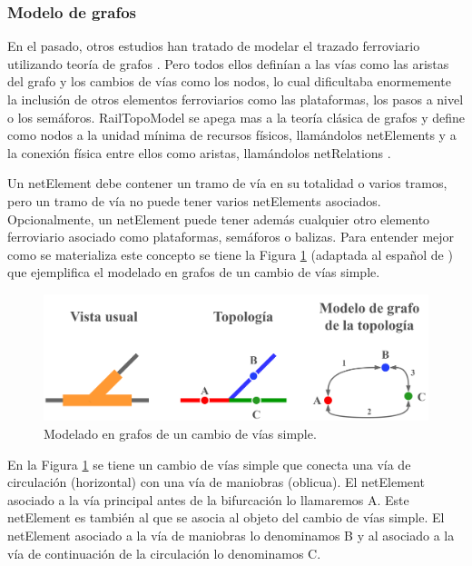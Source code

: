 \subsubsection{Modelo de grafos}
    \label{sec:RTM}
    
    En el pasado, otros estudios han tratado de modelar el trazado ferroviario utilizando teoría de grafos \cite{Paper_9,Paper_101,Paper_102,Paper_103}. Pero todos ellos definían a las vías como las aristas del grafo y los cambios de vías como los nodos, lo cual dificultaba enormemente la inclusión de otros elementos ferroviarios como las plataformas, los pasos a nivel o los semáforos. RailTopoModel se apega mas a la teoría clásica de grafos y define como nodos a la unidad mínima de recursos físicos, llamándolos netElements y a la conexión física entre ellos como aristas, llamándolos netRelations \cite{Paper_109}.

    Un netElement debe contener un tramo de vía en su totalidad o varios tramos, pero un tramo de vía no puede tener varios netElements asociados. Opcionalmente, un netElement puede tener además cualquier otro elemento ferroviario asociado como plataformas, semáforos o balizas. Para entender mejor como se materializa este concepto se tiene la Figura \ref{fig:grafos_1} (adaptada al español de \cite{Paper_109}) que ejemplifica el modelado en grafos de un cambio de vías simple.

    \begin{figure}[H]
        \centering
        \includegraphics[width=1\textwidth]{Figuras/grafos}
        \centering\caption{Modelado en grafos de un cambio de vías simple.}
        \label{fig:grafos_1}
    \end{figure}

    En la Figura \ref{fig:grafos_1} se tiene un cambio de vías simple que conecta una vía de circulación (horizontal) con una vía de maniobras (oblicua). El netElement asociado a la vía principal antes de la bifurcación lo llamaremos A. Este netElement es también al que se asocia al objeto del cambio de vías simple. El netElement asociado a la vía de maniobras lo denominamos B y al asociado a la vía de continuación de la circulación lo denominamos C.

